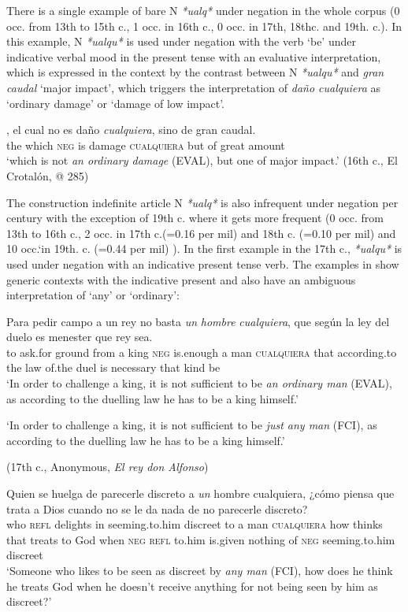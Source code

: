 There is a single example of bare N \textit{*ualq*} under negation in the whole corpus (0 occ. from 13th to 15th c., 1 occ. in 16th c., 0 occ. in 17th, 18thc. and 19th. c.). In this example, N \textit{*ualqu*} is used under negation with the verb ‘be’ under indicative verbal mood in the present tense with an evaluative interpretation, which is expressed in the context by the contrast between N \textit{*ualqu*} and \textit{gran caudal} ‘major impact’, which triggers the interpretation of  \textit{daño cualquiera} as ‘ordinary damage’ or ‘damage of low impact’. 

\ea \label{ex:key:5-1}
\ea{}
\gll [...], el cual no es daño \textit{cualquiera}, sino de gran caudal.\\ 
{} the which \textsc{neg} is damage \textsc{cualquiera} but of great amount\\
\glt ‘which is not \textit{an ordinary damage} (EVAL), but one of major impact.’ (16th c., El Crotalón, @ 285)
\z
\z

\largerpage
The construction indefinite article N \textit{*ualq*} is also infrequent under negation per century with the exception of 19th c. where it gets more frequent (0 occ. from 13th to 16th c., 2 occ. in 17th c.(=0.16 per mil) and 18th c. (=0.10 per mil) and 10 occ.`in 19th. c. (=0.44 per mil) ). In the first example in the 17th c., \textit{*ualqu*} is used under negation with an indicative present tense verb. The examples in  show generic contexts with the indicative present and also have an ambiguous interpretation of ‘any’ or ‘ordinary’:

\ea \label{ex:key:297} %
\ea \label{ex:key:297-1} \gll Para pedir campo a un rey no basta \textit{un} \textit{hombre} \textit{cualquiera}, que según la ley del duelo es menester que rey sea.\\
to ask.for ground from a king \textsc{neg} is.enough a man \textsc{cualquiera} that according.to the law of.the duel is necessary that kind be\\
    \glt ‘In order to challenge a king, it is not sufficient to be \textit{an ordinary man} (EVAL), as according to the duelling law he has to be a king himself.’

‘In order to challenge a king, it is not sufficient to be \textit{just any man} (FCI), as according to the duelling law he has to be a king himself.’

    (17th c., Anonymous, \textit{El rey don Alfonso})
    
\ex \label{ex:key:297-2} \gll Quien se huelga de parecerle discreto a \textit{un} {hombre} {cualquiera}, ¿cómo piensa que trata a Dios cuando no se le da nada de no parecerle discreto?\\
who \textsc{refl} delights in seeming.to.him discreet to a man \textsc{cualquiera} how thinks that treats to God when \textsc{neg} \textsc{refl} to.him is.given nothing of \textsc{neg} seeming.to.him discreet\\
    \glt ‘Someone who likes to be seen as discreet by \textit{any man} (FCI), how does he think he treats God when he doesn’t receive anything for not being seen by him as discreet?’

